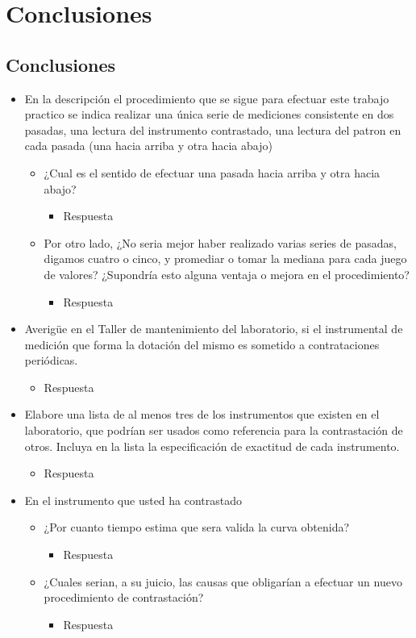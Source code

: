 \chapter{Conclusiones}
\section{Conclusiones}
\begin{itemize}
  \item En la descripción el procedimiento que se sigue para efectuar este trabajo practico se indica realizar una única serie de mediciones consistente en dos pasadas, una lectura del instrumento contrastado, una lectura del patron en cada pasada (una hacia arriba y otra hacia abajo)
  \begin{itemize}
    \item ¿Cual es el sentido de efectuar una pasada hacia arriba y otra hacia abajo?
    \begin{itemize} 
      \item Respuesta
    \end{itemize}
    \item Por otro lado, ¿No seria mejor haber realizado varias series de pasadas, digamos cuatro o cinco, y promediar o tomar la mediana para cada juego de valores? ¿Supondría esto alguna ventaja o mejora en el procedimiento?
      \begin{itemize}
        \item Respuesta
      \end{itemize}
  \end{itemize}
  \item Averigüe en el Taller de mantenimiento del laboratorio, si el instrumental de medición que forma la dotación del mismo es sometido a contrataciones periódicas.
  \begin{itemize} 
    \item Respuesta 
  \end{itemize}
  \item Elabore una lista de al menos tres de los instrumentos que existen en el laboratorio, que podrían ser usados como referencia para la contrastación de otros. Incluya en la lista la especificación de exactitud de cada instrumento.
  \begin{itemize}
    \item Respuesta
  \end{itemize}
  \item En el instrumento que usted ha contrastado
  \begin{itemize}
    \item ¿Por cuanto tiempo estima que sera valida la curva obtenida?
      \begin{itemize}
        \item Respuesta
      \end{itemize}
    \item ¿Cuales serian, a su juicio, las causas que obligarían a efectuar un nuevo procedimiento de contrastación?
      \begin{itemize}
        \item Respuesta
      \end{itemize}
  \end{itemize}
\end{itemize}


